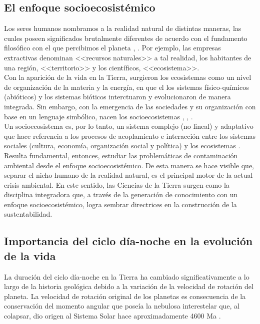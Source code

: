 \subsection{El enfoque socioecosistémico}

Los seres humanos nombramos a la realidad natural de distintas maneras, las cuales poseen significados brutalmente diferentes de acuerdo con el fundamento filosófico con el que percibimos el planeta \citep{Avila2019}, \citep{Uribe2014}. Por ejemplo, las empresas extractivas denominan <<recursos naturales>> a tal realidad, los habitantes de una región, <<territorio>> y los científicos, <<ecosistema>>.\\

Con la aparición de la vida en la Tierra, surgieron los ecosistemas como un nivel de organización de la materia y la energía, en que el los sistemas físico-químicos (abióticos) y los sistemas bióticos interctuaron y evolucionaron de manera integrada. Sin embargo, con la emergencia de las sociedades y su organización con base en un lenguaje simbólico, nacen los socioecosistemas \citep{Avila2019}, \citep{Uribe2014}, \citep{Urquiza2015}.\\

Un socioecosistema es, por lo tanto, un sistema complejo (no lineal) y adaptativo que hace referencia a los procesos de acoplamiento e interacción entre los sistemas sociales (cultura, economía, organización social y política) y los ecosistemas \citep{Urquiza2015}.\\

Resulta fundamental, entonces, estudiar las problemáticas de contaminación ambiental desde el enfoque socioecosistémico. De esta manera se hace visible que, separar el nicho humano de la realidad natural, es el principal motor de la actual crisis ambiental. En este sentido, las Ciencias de la Tierra surgen como la disciplina integradora que, a través de la generación de conocimiento con un enfoque socioecosistémico, logra sembrar directrices en la construcción de la sustentabilidad.\\

\subsection{Importancia del ciclo día-noche en la evolución de la vida}

La duración del ciclo día-noche en la Tierra ha cambiado significativamente a lo largo de la historia geológica debido a la variación de la velocidad de rotación del planeta. La velocidad de rotación original de los planetas  es consecuencia de la conservación del momento angular que poseía la nebulosa interestelar que, al colapsar, dio origen al Sistema Solar hace aproximadamente 4600 Ma \citep{Greaves2005}.\\


